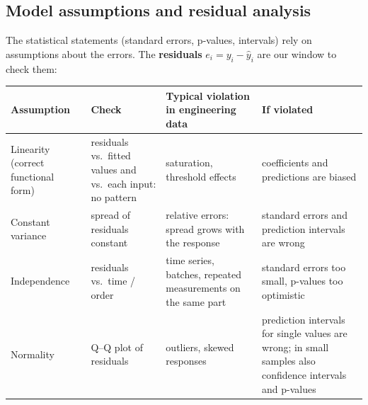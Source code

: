 \documentclass[
  letterpaper,
  DIV=11,
  numbers=noendperiod]{scrreprt}
\begin{document}
\subsection{Model assumptions and residual
analysis}\label{model-assumptions-and-residual-analysis}

The statistical statements (standard errors, p-values, intervals) rely
on assumptions about the errors. The \textbf{residuals}
\(e_i = y_i - \hat y_i\) are our window to check them:

\begin{longtable}[]{@{}
  >{\raggedright\arraybackslash}p{}
  >{\raggedright\arraybackslash}p{}
  >{\raggedright\arraybackslash}p{}
  >{\raggedright\arraybackslash}p{}@{}}
\toprule\noalign{}
\begin{minipage}[b]{\linewidth}\raggedright
Assumption
\end{minipage} & \begin{minipage}[b]{\linewidth}\raggedright
Check
\end{minipage} & \begin{minipage}[b]{\linewidth}\raggedright
Typical violation in engineering data
\end{minipage} & \begin{minipage}[b]{\linewidth}\raggedright
If violated
\end{minipage} \\
\midrule\noalign{}
\endhead
\bottomrule\noalign{}
\endlastfoot
Linearity (correct functional form) & residuals vs.~fitted values and
vs.~each input: no pattern & saturation, threshold effects &
coefficients and predictions are biased \\
Constant variance & spread of residuals constant & relative errors:
spread grows with the response & standard errors and prediction
intervals are wrong \\
Independence & residuals vs.~time / order & time series, batches,
repeated measurements on the same part & standard errors too small,
p-values too optimistic \\
Normality & Q--Q plot of residuals & outliers, skewed responses &
prediction intervals for single values are wrong; in small samples also
confidence intervals and p-values \\
\end{longtable}
\end{document}
